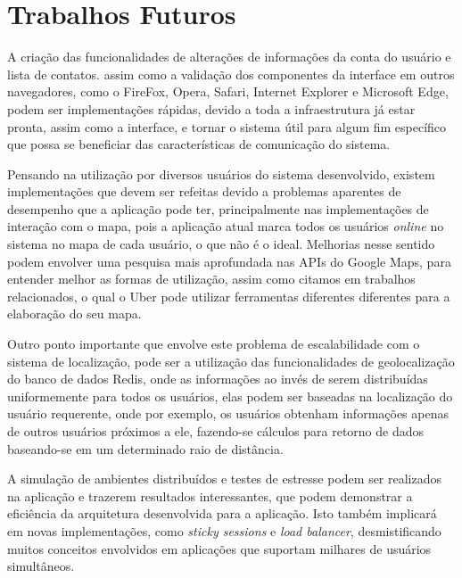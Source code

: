 \chapter{Trabalhos Futuros}
A criação das funcionalidades de alterações de informações da conta do usuário e lista de contatos. assim como a validação dos componentes da interface em outros navegadores, como o FireFox, Opera, Safari, Internet Explorer e Microsoft Edge, podem ser implementações rápidas, devido a toda a infraestrutura já estar pronta, assim como a interface, e tornar o sistema útil para algum fim específico que possa se beneficiar das características de comunicação do sistema.

Pensando na utilização por diversos usuários do sistema desenvolvido, existem implementações que devem ser refeitas devido a problemas aparentes de desempenho que a aplicação pode ter, principalmente nas implementações de interação com o mapa, pois a aplicação atual marca todos os usuários \textit{online} no sistema no mapa de cada usuário, o que não é o ideal. Melhorias nesse sentido podem envolver uma pesquisa mais aprofundada nas APIs do Google Maps, para entender melhor as formas de utilização, assim como citamos em trabalhos relacionados, o qual o Uber pode utilizar ferramentas diferentes diferentes para a elaboração do seu mapa. 

Outro ponto importante que envolve este problema de escalabilidade com o sistema de localização, pode ser a utilização das funcionalidades de geolocalização do banco de dados Redis, onde as informações ao invés de serem distribuídas uniformemente para todos os usuários, elas podem ser baseadas na localização do usuário requerente, onde por exemplo, os usuários obtenham informações apenas de outros usuários próximos a ele, fazendo-se cálculos para retorno de dados baseando-se em um determinado raio de distância.

A simulação de ambientes distribuídos e testes de estresse podem ser realizados na aplicação e trazerem resultados interessantes, que podem demonstrar a eficiência da arquitetura desenvolvida para a aplicação. Isto também implicará em novas implementações, como \textit{sticky sessions} e \textit{load balancer}, desmistificando muitos conceitos envolvidos em aplicações que suportam milhares de usuários simultâneos.